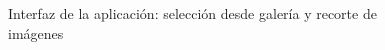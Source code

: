 \begin{figure}[!ht]
 	\caption{Interfaz de la aplicación: selección desde galería y recorte de imágenes}
 	\label{fig:recortarapp}
 \end{figure}
 
